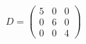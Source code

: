 \documentclass[preview]{standalone}
\begin{document}
\begin{align*}
D = \begin{pmatrix} 5 & 0 & 0 \\ 0 & 6 & 0 \\ 0 & 0 & 4 \end{pmatrix}
\end{align*}
\end{document}
